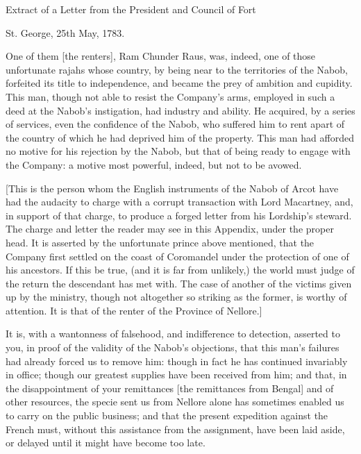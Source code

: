 

Extract of a Letter from the President and Council of Fort 

\centerline{St. George, 25th May, 1783.}

\vspace{0.2cm}
One of them [the renters], Ram Chunder Raus, was, indeed, one of those unfortunate rajahs whose country, by being near to the territories of the Nabob, forfeited its title to independence, and became the prey of ambition and cupidity. This man, though not able to resist the Company's arms, employed in such a deed at the Nabob's instigation, had industry and ability. He acquired, by a series of services, even the confidence of the Nabob, who suffered him to rent apart of the country of which he had deprived him of the property. This man had afforded no motive for his rejection by the Nabob, but that of being ready to engage with the Company: a motive most powerful, indeed, but not to be avowed.

[This is the person whom the English instruments of the Nabob of Arcot have had the audacity to charge with a corrupt transaction with Lord Macartney, and, in support of that charge, to produce a forged letter from his Lordship's steward. The charge and letter the reader may see in this Appendix, under the proper head. It is asserted by the unfortunate prince above mentioned, that the Company first settled on the coast of Coromandel under the protection of one of his ancestors. If this be true, (and it is far from unlikely,) the world must judge of the return the descendant has met with. The case of another of the victims given up by the ministry, though not altogether so striking as the former, is worthy of attention. It is that of the renter of the Province of Nellore.]

It is, with a wantonness of falsehood, and indifference to detection, asserted to you, in proof of the validity of the Nabob's objections, that this man's failures had already forced us to remove him: though in fact he has continued invariably in office; though our greatest supplies have been received from him; and that, in the disappointment of your remittances [the remittances from Bengal] and of other resources, the specie sent us from Nellore alone has sometimes enabled us to carry on the public business; and that the present expedition against the French must, without this assistance from the assignment, have been laid aside, or delayed until it might have become too late.

